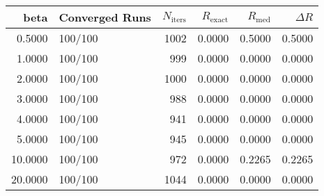 \begin{tabular}{rlrrrr}
\toprule
beta & Converged Runs & $N_{\text{iters}}$ & $R_{\text{exact}}$ & $R_{\text{med}}$ & $\Delta R$ \\
\midrule
0.5000 & 100/100 & 1002 & 0.0000 & 0.5000 & 0.5000 \\
1.0000 & 100/100 & 999 & 0.0000 & 0.0000 & 0.0000 \\
2.0000 & 100/100 & 1000 & 0.0000 & 0.0000 & 0.0000 \\
3.0000 & 100/100 & 988 & 0.0000 & 0.0000 & 0.0000 \\
4.0000 & 100/100 & 941 & 0.0000 & 0.0000 & 0.0000 \\
5.0000 & 100/100 & 945 & 0.0000 & 0.0000 & 0.0000 \\
10.0000 & 100/100 & 972 & 0.0000 & 0.2265 & 0.2265 \\
20.0000 & 100/100 & 1044 & 0.0000 & 0.0000 & 0.0000 \\
\bottomrule
\end{tabular}
